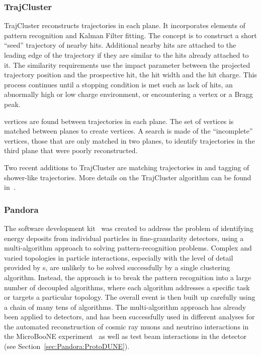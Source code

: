 \subsubsection{TrajCluster}\label{sec:TrajCluster}
TrajCluster reconstructs \twod trajectories in each plane. It incorporates elements of pattern recognition and Kalman Filter fitting. The concept is to construct a short ``seed'' trajectory of nearby hits. Additional nearby hits are attached to the leading edge of the trajectory if they are similar to the hits already attached to it. The similarity requirements use the impact parameter between the projected trajectory position and the prospective hit, the hit width and the hit charge. This process continues until a stopping condition is met such as lack of hits, an abnormally high or low charge environment, or encountering a \twod vertex or a Bragg peak.

\twod vertices are found between trajectories in each plane. The set of \twod vertices is matched between planes to create \threed vertices. A search is made of the ``incomplete'' \threed vertices, those that are only matched in two planes, to identify trajectories in the third plane that were poorly reconstructed.

Two recent additions to TrajCluster are matching trajectories in \threed and tagging of shower-like trajectories. More details on the TrajCluster algorithm can be found in~\cite{ref:trajcluster}.



\subsubsection{Pandora}\label{sec:Pandora}

The  software development kit~\cite{Marshall:2015rfa} was created to address the problem of identifying energy deposits from individual particles in fine-granularity detectors, using a multi-algorithm approach to solving pattern-recognition problems. Complex and varied topologies in particle interactions, especially with the level of detail provided by \lartpc{}s, are unlikely to be solved successfully by a single clustering algorithm. Instead, the  approach is to break the pattern recognition into a large number of decoupled algorithms, where each algorithm addresses a specific task or targets a particular topology. The overall event is then built up carefully using a chain of many tens of algorithms. The  multi-algorithm approach has already been applied to \lartpc{} detectors, and has been successfully used in different analyses for the automated reconstruction of cosmic ray muons and neutrino interactions in the MicroBooNE experiment~\cite{Acciarri:2017hat} as well as test beam interactions in the  detector (see Section~\ref{sec:Pandora:ProtoDUNE}).


